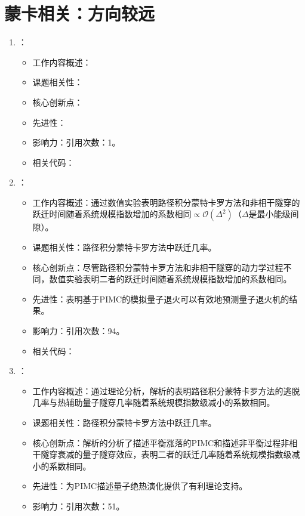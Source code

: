 \section{蒙卡相关：方向较远}
\begin{enumerate}
    \item \citet{bravyi2015simulacion}：
    \begin{itemize}
        \item 工作内容概述：
        \item 课题相关性：
        \item 核心创新点：
        \item 先进性：
        \item 影响力：引用次数：1。
        \item 相关代码：
    \end{itemize}
    \item \citet{isakov2016understanding}：
    \begin{itemize}
        \item 工作内容概述：通过数值实验表明路径积分蒙特卡罗方法和非相干隧穿的跃迁时间随着系统规模指数增加的系数相同$\propto \mathcal{O}(\Delta^2)$（$\Delta$是最小能级间隙）。
        \item 课题相关性：路径积分蒙特卡罗方法中跃迁几率。
        \item 核心创新点：尽管路径积分蒙特卡罗方法和非相干隧穿的动力学过程不同，数值实验表明二者的跃迁时间随着系统规模指数增加的系数相同。
        \item 先进性：表明基于PIMC的模拟量子退火可以有效地预测量子退火机的结果。
        \item 影响力：引用次数：94。
        \item 相关代码：
    \end{itemize}
    \item \citet{jiang2017scaling}：
    \begin{itemize}
        \item 工作内容概述：通过理论分析，解析的表明路径积分蒙特卡罗方法的逃脱几率与热辅助量子隧穿几率随着系统规模指数级减小的系数相同。
        \item 课题相关性：路径积分蒙特卡罗方法中跃迁几率。
        \item 核心创新点：解析的分析了描述平衡涨落的PIMC和描述非平衡过程非相干隧穿衰减的量子隧穿效应，表明二者的跃迁几率随着系统规模指数级减小的系数相同。
        \item 先进性：为PIMC描述量子绝热演化提供了有利理论支持。
        \item 影响力：引用次数：51。

\end{itemize}
\end{enumerate}
